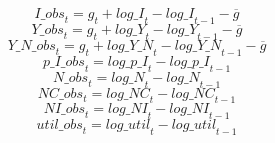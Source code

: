 \begin{dmath}
{I\_obs}_{t}={{g}}_{t}+{log\_I}_{t}-{log\_I}_{t-1}-{{\overline{g}}}
\end{dmath}
\begin{dmath}
{Y\_obs}_{t}={{g}}_{t}+{log\_Y}_{t}-{log\_Y}_{t-1}-{{\overline{g}}}
\end{dmath}
\begin{dmath}
{Y\_N\_obs}_{t}={{g}}_{t}+{log\_Y\_N}_{t}-{log\_Y\_N}_{t-1}-{{\overline{g}}}
\end{dmath}
\begin{dmath}
{p\_I\_obs}_{t}={log\_p\_I}_{t}-{log\_p\_I}_{t-1}
\end{dmath}
\begin{dmath}
{N\_obs}_{t}={log\_N}_{t}-{log\_N}_{t-1}
\end{dmath}
\begin{dmath}
{NC\_obs}_{t}={log\_NC}_{t}-{log\_NC}_{t-1}
\end{dmath}
\begin{dmath}
{NI\_obs}_{t}={log\_NI}_{t}-{log\_NI}_{t-1}
\end{dmath}
\begin{dmath}
{util\_obs}_{t}={log\_util}_{t}-{log\_util}_{t-1}
\end{dmath}
